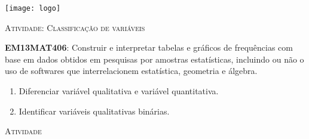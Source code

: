 \documentclass[10 pt,usenames,dvipsnames, oneside]{article}
\begin{document}
\begin{center}
  \begin{minipage}[l]{3cm}
\texttt{[image: logo]}    
\end{minipage}\hfill
\begin{minipage}[r]{.8\textwidth}
 {\Large \scshape Atividade: Classificação de variáveis}  
\end{minipage}
\end{center}
\vspace{.2cm}

\ifdefined\prof
\begin{objetivos}
\item \textbf{EM13MAT406}: Construir e interpretar tabelas e gráficos de frequências com base em dados obtidos em pesquisas por amostras estatísticas, incluindo ou não o uso de softwares que interrelacionem estatística, geometria e álgebra.
\end{objetivos}

\begin{goals}
\begin{enumerate}
\item Diferenciar variável qualitativa e variável quantitativa.
\item Identificar variáveis qualitativas binárias.
\end{enumerate}

\end{goals}

\bigskip
\begin{center}
{\large \scshape Atividade}
\end{center}
\fi
\end{document}
